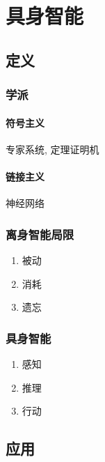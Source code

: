\newpage
\section{具身智能}
\subsection{定义}

\subsubsection{学派}
\paragraph{符号主义}
专家系统, 定理证明机

\paragraph{链接主义}
神经网络

\subsubsection{离身智能局限}
\begin{enumerate}
    \item 被动
    \item 消耗
    \item 遗忘
\end{enumerate}

\subsubsection{具身智能}
\begin{enumerate}
    \item 感知
    \item 推理
    \item 行动
\end{enumerate}

\subsection{应用}